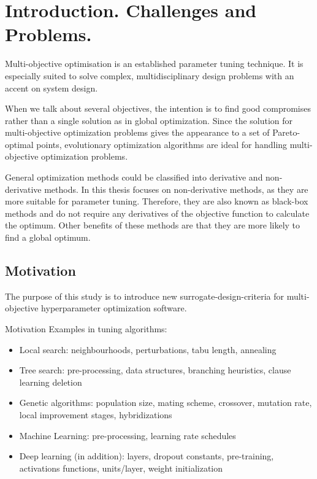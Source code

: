 \chapter{Introduction. Challenges and Problems.}

Multi-objective optimisation is an established parameter tuning technique. It is especially suited to solve complex, multidisciplinary design problems with an accent on system design.

When we talk about several objectives, the intention is to find good compromises rather than a single solution as in global optimization.
Since the solution for multi-objective optimization problems gives the appearance to a set of Pareto-optimal points, evolutionary optimization algorithms are ideal for handling multi-objective optimization problems.

General optimization methods could be classified into derivative and non-derivative methods. In this thesis focuses on non-derivative methods, as they are more suitable for parameter tuning. Therefore, they are also known as black-box methods and do not require any derivatives of the objective function to calculate the optimum.  Other benefits of these methods are that they are more likely to find a global optimum. 

\section{Motivation}
    The purpose of this study is to introduce new surrogate-design-criteria for multi-objective hyperparameter optimization software.

    Motivation Examples in tuning algorithms:
    \begin{itemize}
        \item Local search: neighbourhoods, perturbations, tabu length, annealing
        \item Tree search: pre-processing, data structures, branching heuristics, clause learning deletion
        \item Genetic algorithms: population size, mating scheme, crossover, mutation rate, local improvement stages, hybridizations
        \item Machine Learning: pre-processing, learning rate schedules
        \item Deep learning (in addition): layers, dropout constants, pre-training, activations functions, units/layer, weight initialization  
    \end{itemize}

